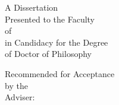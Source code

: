 \begin{titlepage}

\makeatletter
\thispagestyle{empty}
\sc
\vspace*{0in}
\begin{center}
  \LARGE \@title
\end{center}
\vspace{.6in}
\begin{center}
	\@author
	\end{center}
\vspace{.6in}
\begin{center}
  A Dissertation \\
  Presented to the Faculty \\
  of \@university \\
  in Candidacy for the Degree \\
  of Doctor of Philosophy
\end{center}
\vspace{.3in}
\begin{center}
  Recommended for Acceptance \\
  by the \@department \\
  Adviser: \@adviser
\end{center}
\vspace{.3in}
\begin{center}

\@date

\end{center}
\makeatother

\end{titlepage}
